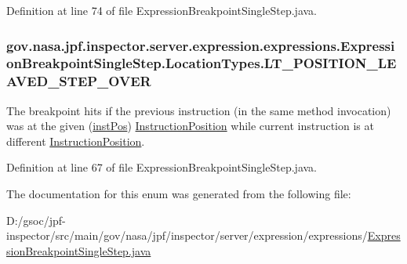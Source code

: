 Definition at line 74 of file Expression\+Breakpoint\+Single\+Step.\+java.

\subsubsection[{\texorpdfstring{L\+T\+\_\+\+P\+O\+S\+I\+T\+I\+O\+N\+\_\+\+L\+E\+A\+V\+E\+D\+\_\+\+S\+T\+E\+P\+\_\+\+O\+V\+ER}{LT_POSITION_LEAVED_STEP_OVER}}]{\setlength{\rightskip}{0pt plus 5cm}gov.\+nasa.\+jpf.\+inspector.\+server.\+expression.\+expressions.\+Expression\+Breakpoint\+Single\+Step.\+Location\+Types.\+L\+T\+\_\+\+P\+O\+S\+I\+T\+I\+O\+N\+\_\+\+L\+E\+A\+V\+E\+D\+\_\+\+S\+T\+E\+P\+\_\+\+O\+V\+ER}\hypertarget{enumgov_1_1nasa_1_1jpf_1_1inspector_1_1server_1_1expression_1_1expressions_1_1_expression_breakp227857a8c42509ddd72c386e68619da4_a4b29cfc40330ff5457401ec92bd3365e}{}\label{enumgov_1_1nasa_1_1jpf_1_1inspector_1_1server_1_1expression_1_1expressions_1_1_expression_breakp227857a8c42509ddd72c386e68619da4_a4b29cfc40330ff5457401ec92bd3365e}


The breakpoint hits if the previous instruction (in the same method invocation) was at the given (\hyperlink{classgov_1_1nasa_1_1jpf_1_1inspector_1_1server_1_1expression_1_1expressions_1_1_expression_breakpoint_single_step_a72c10f41814ab478d923986e7c06b0da}{inst\+Pos}) \hyperlink{}{Instruction\+Position} while current instruction is at different \hyperlink{}{Instruction\+Position}. 



Definition at line 67 of file Expression\+Breakpoint\+Single\+Step.\+java.



The documentation for this enum was generated from the following file\+:\begin{DoxyCompactItemize}
\item 
D\+:/gsoc/jpf-\/inspector/src/main/gov/nasa/jpf/inspector/server/expression/expressions/\hyperlink{_expression_breakpoint_single_step_8java}{Expression\+Breakpoint\+Single\+Step.\+java}\end{DoxyCompactItemize}
